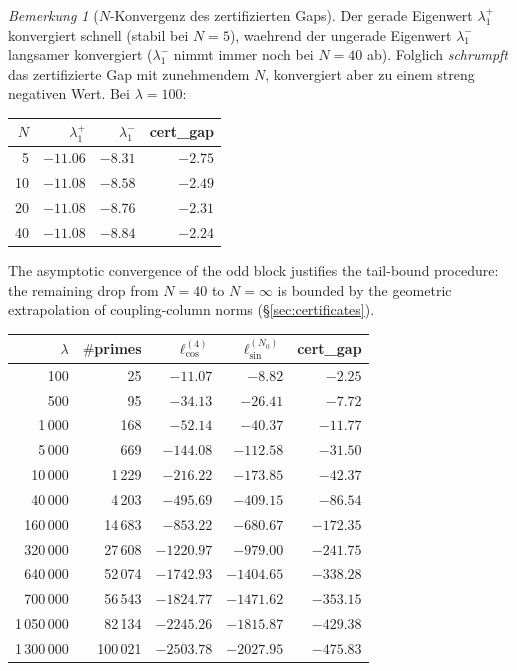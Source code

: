 \documentclass[12pt,a4paper]{article}
\theoremstyle{definition}
\theoremstyle{remark}
\newtheorem{remark}[theorem]{Bemerkung}
\begin{document}
\begin{remark}[$N$-Konvergenz des zertifizierten Gaps]
\label{rem:N-convergence}
Der gerade Eigenwert $\lambda_1^+$ konvergiert schnell (stabil bei $N = 5$), waehrend der ungerade Eigenwert $\lambda_1^-$ langsamer konvergiert ($\lambda_1^-$ nimmt immer noch bei $N = 40$ ab). Folglich \emph{schrumpft} das zertifizierte Gap mit zunehmendem $N$, konvergiert aber zu einem streng negativen Wert. Bei $\lambda = 100$:

\begin{center}
\small
\begin{tabular}{r|r|r|r}
$N$ & $\lambda_1^+$ & $\lambda_1^-$ & cert\_gap \\\hline
5 & $-11.06$ & $-8.31$ & $-2.75$ \\
10 & $-11.08$ & $-8.58$ & $-2.49$ \\
20 & $-11.08$ & $-8.76$ & $-2.31$ \\
40 & $-11.08$ & $-8.84$ & $-2.24$
\end{tabular}
\end{center}

\noindent The asymptotic convergence of the odd block justifies the tail-bound procedure: the remaining drop from $N = 40$ to $N = \infty$ is bounded by the geometric extrapolation of coupling-column norms (\S\ref{sec:certificates}).
\end{remark}

\begin{center}
\small
\renewcommand{\arraystretch}{1.15}
\begin{tabular}{r|r|r|r|r}
$\lambda$ & $\#$primes & $\ell_{\cos}^{(4)}$ & $\ell_{\sin}^{(N_0)}$ & cert\_gap \\\hline
100   & 25     & $-11.07$ & $-8.82$   & $-2.25$ \\
500   & 95     & $-34.13$ & $-26.41$  & $-7.72$ \\
1\,000 & 168   & $-52.14$ & $-40.37$  & $-11.77$ \\
5\,000 & 669   & $-144.08$ & $-112.58$ & $-31.50$ \\
10\,000 & 1\,229 & $-216.22$ & $-173.85$ & $-42.37$ \\
40\,000 & 4\,203 & $-495.69$ & $-409.15$ & $-86.54$ \\
160\,000 & 14\,683 & $-853.22$ & $-680.67$ & $-172.35$ \\
320\,000 & 27\,608 & $-1220.97$ & $-979.00$ & $-241.75$ \\
640\,000 & 52\,074 & $-1742.93$ & $-1404.65$ & $-338.28$ \\
700\,000 & 56\,543 & $-1824.77$ & $-1471.62$ & $-353.15$ \\
1\,050\,000 & 82\,134 & $-2245.26$ & $-1815.87$ & $-429.38$ \\
1\,300\,000 & 100\,021 & $-2503.78$ & $-2027.95$ & $-475.83$
\end{tabular}
\end{center}
\end{document}
